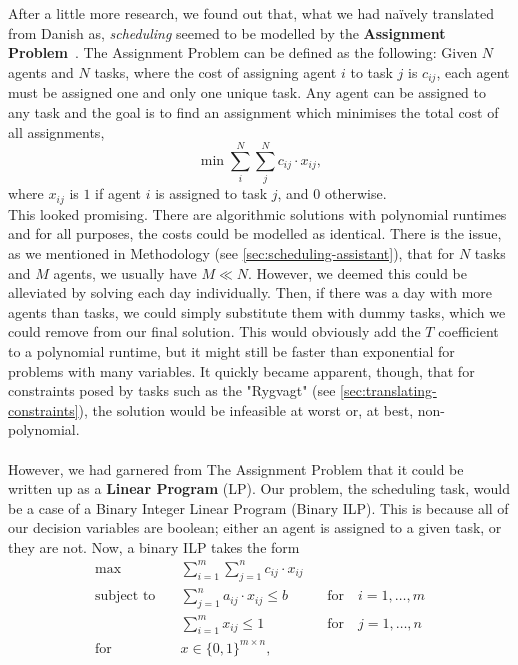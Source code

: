 \\
\\
After a little more research, we found out that, what we had na\"ively translated from Danish as, \emph{scheduling} seemed to be modelled by the \textbf{Assignment Problem}~\cite{Wiki-assignment-prob}. The Assignment Problem can be defined as the following: Given \(N\) agents and \(N\) tasks, where the cost of assigning agent \(i\) to task \(j\) is \(c_{ij}\), each agent must be assigned one and only one unique task. Any agent can be assigned to any task and the goal is to find an assignment which minimises the total cost of all assignments,
\begin{equation*}
    \min \sum_{i}^N \sum_{j}^N c_{ij} \cdot x_{ij},
\end{equation*}
where \(x_{ij}\) is \(1\) if agent \(i\) is assigned to task \(j\), and \(0\) otherwise.
\\
This looked promising. There are algorithmic solutions with polynomial runtimes and for all purposes, the costs could be modelled as identical. There is the issue, as we mentioned in Methodology (see \autoref{sec:scheduling-assistant}), that for \(N\) tasks and \(M\) agents, we usually have \(M \ll N\). However, we deemed this could be alleviated by solving each day individually. Then, if there was a day with more agents than tasks, we could simply substitute them with dummy tasks, which we could remove from our final solution. This would obviously add the \(T\) coefficient to a polynomial runtime, but it might still be faster than exponential for problems with many variables. It quickly became apparent, though, that for constraints posed by tasks such as the "Rygvagt" (see \autoref{sec:translating-constraints}), the solution would be infeasible at worst or, at best, non-polynomial.
\\
\\
However, we had garnered from The Assignment Problem that it could be written up as a \textbf{Linear Program}\cite{OR-Intro-Book} (LP). Our problem, the scheduling task, would be a case of a Binary Integer Linear Program (Binary ILP). This is because all of our decision variables are boolean; either an agent is assigned to a given task, or they are not.
Now, a binary ILP takes the form\cite{Integer-Programming-Book} 
\begin{equation}\label{eq:binary-ILP}
    \begin{aligned}
    \max \quad &\sum_{i = 1}^m \sum_{j = 1}^n c_{ij} \cdot x_{ij}
    \\
    \text{subject to} \quad &\sum_{j = 1}^n a_{ij} \cdot x_{ij} \leq b \qquad &\text{for} \quad i = 1, \hdots, m
    \\
    &\sum_{i = 1}^m x_{ij} \leq 1 \qquad &\text{for} \quad j = 1, \hdots, n
    \\
    \text{for} \quad &x \in \{0, 1\}^{m \times n},
    \end{aligned}
\end{equation}
